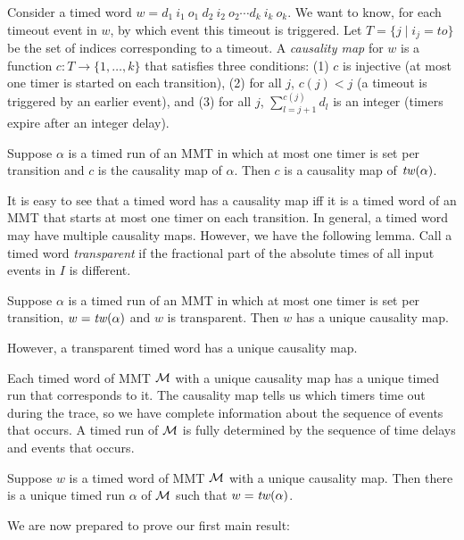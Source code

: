 \fi
Consider a timed word
$w  =   d_1 ~ i_1 ~ o_1 ~ d_2 ~ i_2 ~ o_2 \cdots d_k ~ i_k ~ o_k$.
We want to know, for each timeout event in $w$, by which event this timeout is triggered.
Let $T = \{ j \mid i_j = \mathit{to} \}$ be the set of indices corresponding to a timeout.
A \emph{causality map} for $w$ is a function $c: T \rightarrow \{ 1 ,\ldots, k \}$ that satisfies three conditions:
(1)
$c$ is injective (at most one timer is started on each transition),
(2)
for all $j$, $c(j) < j$ (a timeout is triggered by an earlier event), and
(3)
for all $j$, $\sum_{l=j+1}^{c(j)} d_l$ is an integer (timers expire after an integer delay).
\iflong
\begin{lemma}
\label{causality map run is causility map of its timed word}
Suppose $\alpha$ is a timed run of an MMT in which at most one timer is set
per transition and $c$ is the causality map of $\alpha$. 
Then $c$ is a causality map of $\mathit{tw}(\alpha)$.
\end{lemma}
\else
It is easy to see that a timed word has a causality map iff it is a timed word of an MMT that starts at most one timer
on each transition. 
\fi
In general, a timed word may have multiple causality maps.
\iflong
However, we have the following lemma.
Call a timed word \emph{transparent} if the fractional part of the absolute times of all input events in $I$ is different.

\begin{lemma}
\label{lemma unique causality map}
Suppose $\alpha$ is a timed run of an MMT in which at most one timer is set
per transition, $w =  \mathit{tw}(\alpha)$ and $w$ is transparent. 
Then $w$ has a unique causality map.
\end{lemma}
\else
However, a transparent timed word has a unique causality map.
\fi

Each timed word of MMT ${\mathcal M}$ with a unique causality map has a unique timed run that corresponds to it.
The causality map tells us which timers time out during the trace, so we have complete information
about the sequence of events that occurs. 
\iflong
A timed run of ${\mathcal M}$ is fully determined
by the sequence of time delays and events that occurs.

\begin{lemma}
\label{lemma unique timed run}
Suppose $w$ is a timed word of MMT ${\mathcal M}$ with a unique causality map.
Then there is a unique timed run $\alpha$ of ${\mathcal M}$ such that $w = \mathit{tw}(\alpha)$.
\end{lemma}

\fi
We are now prepared to prove our first main result:

